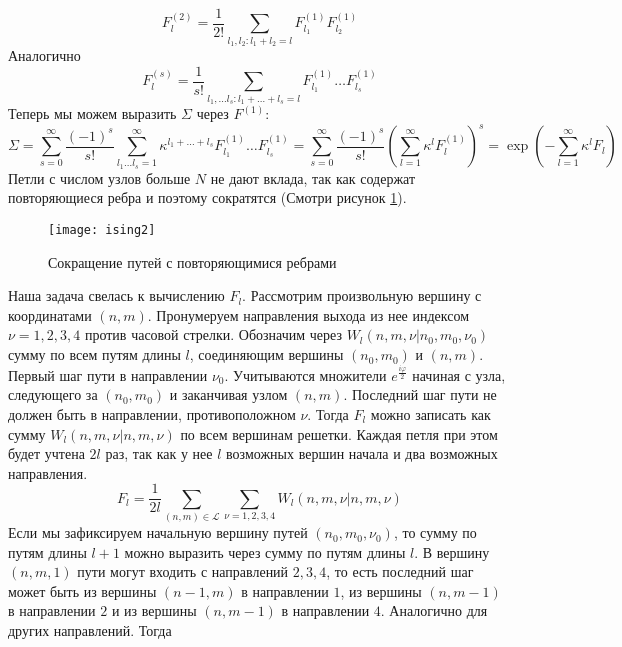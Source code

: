 \documentclass[a4paper,12pt]{article} \usepackage[utf8x]{inputenc} \usepackage[russian]{babel}
\theoremstyle{definition} \newtheorem{corollary}{Corollary}[theorem] \theoremstyle{definition}
\begin{document}
\begin{equation}
  \label{eq:118} F^{(2)}_l=\frac{1}{2!}\sum_{l_1,l_2:l_1+l_2=l} F^{(1)}_{l_1} F^{(1)}_{l_2}
\end{equation} Аналогично
\begin{equation}
  \label{eq:119} F^{(s)}_l=\frac{1}{s!}\sum_{l_1,\dots l_s:l_1+\dots+l_s=l} F^{(1)}_{l_1}\dots
F^{(1)}_{l_s}
\end{equation} Теперь мы можем выразить $\Sigma$ через $F^{(1)}$:
\begin{equation}
  \label{eq:120} \Sigma=\sum_{s=0}^{\infty}\frac{(-1)^s}{s!}\sum_{l_1\dots l_s=1}^{\infty}
\kappa^{l_1+\dots+l_s}F^{(1)}_{l_1} \dots F^{(1)}_{l_s}=
\sum_{s=0}^{\infty}\frac{(-1)^s}{s!}\left(\sum_{l=1}^{\infty} \kappa^{l}F^{(1)}_{l} \right)^s
=\exp\left(-\sum_{l=1}^{\infty} \kappa^l F_l\right)
\end{equation} Петли с числом узлов больше $N$ не дают вклада, так как содержат повторяющиеся ребра
и поэтому сократятся (Смотри рисунок \ref{fig:ising-2}).
\begin{figure}[h!tb] \centering
  \texttt{[image: ising2]}
  \caption{Сокращение путей с повторяющимися ребрами}
  \label{fig:ising-2}
\end{figure} Наша задача свелась к вычислению $F_l$. Рассмотрим произвольную вершину с координатами
$(n,m)$. Пронумеруем направления выхода из нее индексом $\nu=1,2,3,4$ против часовой стрелки.
Обозначим через $W_l (n,m,\nu|n_0,m_0,\nu_0)$ сумму по всем путям длины $l$, соединяющим вершины
$(n_0,m_0)$ и $(n,m)$. Первый шаг пути в направлении $\nu_0$. Учитываются множители
$e^{\frac{i\varphi}{2}}$ начиная с узла, следующего за $(n_0,m_0)$ и заканчивая узлом $(n,m)$.
Последний шаг пути не должен быть в направлении, противоположном $\nu$. Тогда $F_l$ можно записать
как сумму $W_l(n,m,\nu|n,m,\nu)$ по всем вершинам решетки. Каждая петля при этом будет учтена $2l$
раз, так как у нее $l$ возможных вершин начала и два возможных направления.
\begin{equation}
  \label{eq:121} F_l=\frac{1}{2l}\sum_{(n,m)\in \mathcal{L}} \sum_{\nu=1,2,3,4} W_l(n,m,\nu|n,m,\nu)
\end{equation} Если мы зафиксируем начальную вершину путей $(n_0,m_0,\nu_0)$, то сумму по путям
длины $l+1$ можно выразить через сумму по путям длины $l$. В вершину $(n,m,1)$ пути могут входить с
направлений $2,3,4$, то есть последний шаг может быть из вершины $(n-1,m)$ в направлении $1$, из
вершины $(n,m-1)$ в направлении $2$ и из вершины $(n,m-1)$ в направлении $4$. Аналогично для других
направлений. Тогда
\end{document}
